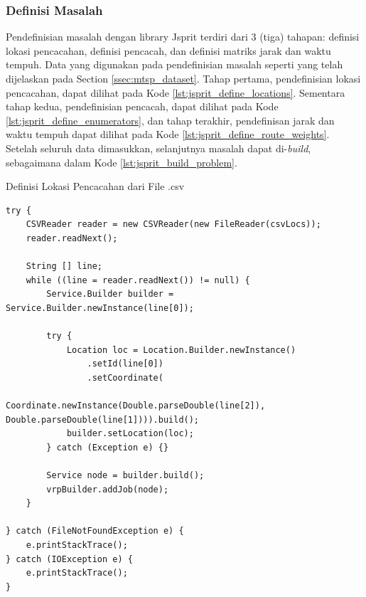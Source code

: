 \subsubsection{Definisi Masalah}
Pendefinisian masalah dengan library Jsprit terdiri dari 3 (tiga) tahapan: definisi lokasi pencacahan, definisi pencacah, dan definisi matriks jarak dan waktu tempuh. Data yang digunakan pada pendefinisian masalah seperti yang telah dijelaskan pada Section \ref{ssec:mtsp_dataset}. Tahap pertama, pendefinisian lokasi pencacahan, dapat dilihat pada Kode \ref{lst:jsprit_define_locations}. Sementara tahap kedua, pendefinisian pencacah, dapat dilihat pada Kode \ref{lst:jsprit_define_enumerators}, dan tahap terakhir, pendefinisan jarak dan waktu tempuh dapat dilihat pada Kode \ref{lst:jsprit_define_route_weights}. Setelah seluruh data dimasukkan, selanjutnya masalah dapat di-\textit{build}, sebagaimana dalam Kode \ref{lst:jsprit_build_problem}.


\begin{listing}
	\caption{Definisi Lokasi Pencacahan dari File .csv}
	\label{lst:jsprit_define_locations}
	\begin{verbatim}
try {
    CSVReader reader = new CSVReader(new FileReader(csvLocs));
    reader.readNext();

    String [] line;
    while ((line = reader.readNext()) != null) {
        Service.Builder builder = Service.Builder.newInstance(line[0]);

        try {
            Location loc = Location.Builder.newInstance()
                .setId(line[0])
                .setCoordinate(
                    Coordinate.newInstance(Double.parseDouble(line[2]), Double.parseDouble(line[1]))).build();
            builder.setLocation(loc);
        } catch (Exception e) {}

        Service node = builder.build();
        vrpBuilder.addJob(node);
    }

} catch (FileNotFoundException e) {
    e.printStackTrace();
} catch (IOException e) {
    e.printStackTrace();
}
	\end{verbatim}
\end{listing}


